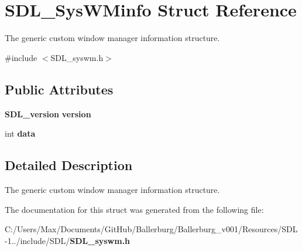 \section{S\+D\+L\+\_\+\+Sys\+W\+Minfo Struct Reference}
\label{struct_s_d_l___sys_w_minfo}


The generic custom window manager information structure.  




{\ttfamily \#include $<$S\+D\+L\+\_\+syswm.\+h$>$}

\subsection*{Public Attributes}
\begin{DoxyCompactItemize}
\item 
{\bf S\+D\+L\+\_\+version} {\bfseries version}\label{struct_s_d_l___sys_w_minfo_ac3a70af022d4849e9ff546595e94627f}

\item 
int {\bfseries data}\label{struct_s_d_l___sys_w_minfo_ac69151baa9187a402f9f9e4ce9ed7c8a}

\end{DoxyCompactItemize}


\subsection{Detailed Description}
The generic custom window manager information structure. 

The documentation for this struct was generated from the following file\+:\begin{DoxyCompactItemize}
\item 
C\+:/\+Users/\+Max/\+Documents/\+Git\+Hub/\+Ballerburg/\+Ballerburg\+\_\+v001/\+Resources/\+S\+D\+L-\/1../include/\+S\+D\+L/{\bf S\+D\+L\+\_\+syswm.\+h}\end{DoxyCompactItemize}
